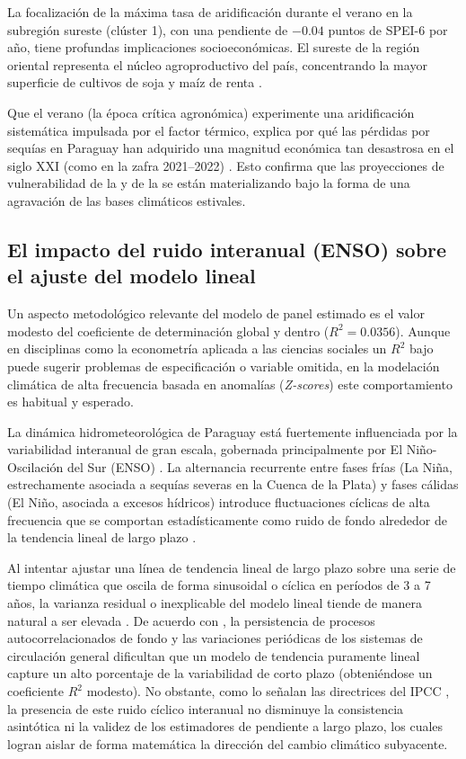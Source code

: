 La focalización de la máxima tasa de aridificación durante el verano en la subregión sureste (clúster 1), con una pendiente de $-0.04$ puntos de SPEI-6 por año, tiene profundas implicaciones socioeconómicas. El sureste de la región oriental representa el núcleo agroproductivo del país, concentrando la mayor superficie de cultivos de soja y maíz de renta \cite{cepal2014}. 

Que el verano (la época crítica agronómica) experimente una aridificación sistemática impulsada por el factor térmico, explica por qué las pérdidas por sequías en Paraguay han adquirido una magnitud económica tan desastrosa en el siglo XXI (como en la zafra 2021--2022) \cite{enciso2022soja}. Esto confirma que las proyecciones de vulnerabilidad de la  y de la  se están materializando bajo la forma de una agravación de las bases climáticos estivales.

\subsection{El impacto del ruido interanual (ENSO) sobre el ajuste del modelo lineal}

Un aspecto metodológico relevante del modelo de panel estimado es el valor modesto del coeficiente de determinación global y dentro ($R^2 = 0.0356$). Aunque en disciplinas como la econometría aplicada a las ciencias sociales un $R^2$ bajo puede sugerir problemas de especificación o variable omitida, en la modelación climática de alta frecuencia basada en anomalías (\textit{Z-scores}) este comportamiento es habitual y esperado.

La dinámica hidrometeorológica de Paraguay está fuertemente influenciada por la variabilidad interanual de gran escala, gobernada principalmente por El Niño-Oscilación del Sur (ENSO) \cite{grimm2009}. La alternancia recurrente entre fases frías (La Niña, estrechamente asociada a sequías severas en la Cuenca de la Plata) y fases cálidas (El Niño, asociada a excesos hídricos) introduce fluctuaciones cíclicas de alta frecuencia que se comportan estadísticamente como ruido de fondo alrededor de la tendencia lineal de largo plazo \cite{penalba2016}.

Al intentar ajustar una línea de tendencia lineal de largo plazo sobre una serie de tiempo climática que oscila de forma sinusoidal o cíclica en períodos de 3 a 7 años, la varianza residual o inexplicable del modelo lineal tiende de manera natural a ser elevada \cite{wilks2011}. De acuerdo con , la persistencia de procesos autocorrelacionados de fondo y las variaciones periódicas de los sistemas de circulación general dificultan que un modelo de tendencia puramente lineal capture un alto porcentaje de la variabilidad de corto plazo (obteniéndose un coeficiente $R^2$ modesto). No obstante, como lo señalan las directrices del IPCC \cite{stocker_climate_2013}, la presencia de este ruido cíclico interanual no disminuye la consistencia asintótica ni la validez de los estimadores de pendiente a largo plazo, los cuales logran aislar de forma matemática la dirección del cambio climático subyacente.

